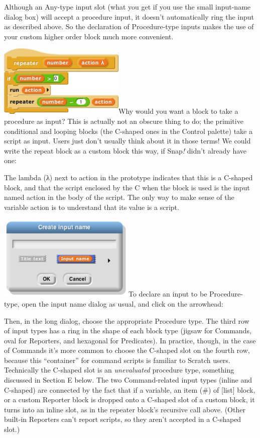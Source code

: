 Although an Any-type input slot (what you get if you use the small
input-name dialog box) will accept a procedure input, it doesn't
automatically ring the input as described above. So the declaration of
Procedure-type inputs makes the use of your custom higher order block
much more convenient.

\includegraphics[width=2.375in,height=1.35417in]{media/image708.png}Why
would you want a block to take a procedure as input? This is actually
not an obscure thing to do; the primitive conditional and looping blocks
(the C-shaped ones in the Control palette) take a script as input. Users
just don't usually think about it in those terms! We could write the
repeat block as a custom block this way, if Snap\emph{!} didn't already
have one:

The lambda (λ) next to action in the prototype indicates that this is a
C-shaped block, and that the script enclosed by the C when the block is
used is the input named action in the body of the script. The only way
to make sense of the variable action is to understand that its value is
a script.

\includegraphics[width=2.58333in,height=1.60417in]{media/image509.png}To
declare an input to be Procedure-type, open the input name dialog as
usual, and click on the arrowhead:

Then, in the long dialog, choose the appropriate Procedure type. The
third row of input types has a ring in the shape of each block type
(jigsaw for Commands, oval for Reporters, and hexagonal for Predicates).
In practice, though, in the case of Commands it's more common to choose
the C-shaped slot on the fourth row, because this ``container'' for
command scripts is familiar to Scratch users. Technically the C-shaped
slot is an \emph{unevaluated} procedure type, something discussed in
Section E below. The two Command-related input types (inline and
C-shaped) are connected by the fact that if a variable, an item (\#) of
{[}list{]} block, or a custom Reporter block is dropped onto a C-shaped
slot of a custom block, it turns into an inline slot, as in the repeater
block's recursive call above. (Other built-in Reporters can't report
scripts, so they aren't accepted in a C-shaped slot.)

